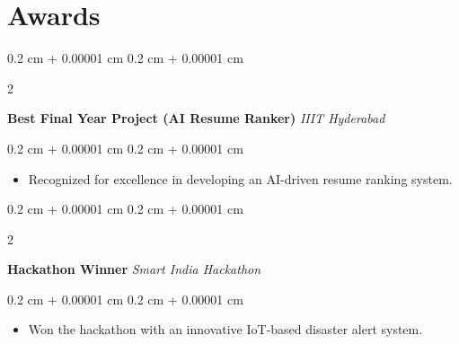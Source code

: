 \documentclass[10pt, letterpaper]{article}
\newenvironment{highlightsforbulletentries}{
        \begin{itemize}[
            topsep=0.10 cm,
            parsep=0.10 cm,
            partopsep=0pt,
            itemsep=0pt,
            leftmargin=10pt
        ]
    }{
        \end{itemize}
    }
\newenvironment{onecolentry}{
        \begin{adjustwidth}{
            0.2 cm + 0.00001 cm
        }{
            0.2 cm + 0.00001 cm
        }
    }{
        \end{adjustwidth}
    }
\newenvironment{twocolentry}[2][]{
        \onecolentry
        \def\secondColumn{#2}
        \setcolumnwidth{\fill, 4.5 cm}
        \begin{paracol}{2}
    }{
        \switchcolumn \raggedleft \secondColumn
        \end{paracol}
        \endonecolentry
    }
\begin{document}
        \section{Awards}
        \begin{samepage}
                \begin{twocolentry}{
                    2021
                }
                \textbf{Best Final Year Project (AI Resume Ranker)}        
                \textit{IIIT Hyderabad}
                \end{twocolentry}
                \vspace{0.10 cm}
                \begin{onecolentry}
                    \begin{highlightsforbulletentries}
                            \item Recognized for excellence in developing an AI-driven resume ranking system.
                            \vspace{-2pt}
                    \end{highlightsforbulletentries}
                \end{onecolentry}
            \end{samepage}
            \vspace{0.2 cm}
        \begin{samepage}
                \begin{twocolentry}{
                    2020
                }
                \textbf{Hackathon Winner}        
                \textit{Smart India Hackathon}
                \end{twocolentry}
                \vspace{0.10 cm}
                \begin{onecolentry}
                    \begin{highlightsforbulletentries}
                            \item Won the hackathon with an innovative IoT-based disaster alert system.
                            \vspace{-2pt}
                    \end{highlightsforbulletentries}
                \end{onecolentry}
            \end{samepage}
            \vspace{0.2 cm}
\end{document}
